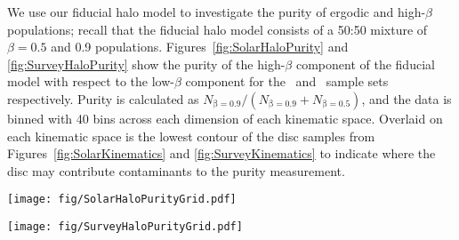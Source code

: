 We use our fiducial halo model to investigate the purity of ergodic and high-$\beta$ populations; recall that the fiducial halo model consists of a 50:50 mixture of $\beta=0.5$ and 0.9 populations. Figures~\ref{fig:SolarHaloPurity} and \ref{fig:SurveyHaloPurity} show the purity of the high-$\beta$ component of the fiducial model with respect to the low-$\beta$ component for the \solar\ and \survey\ sample sets respectively. Purity is calculated as $N_\mathrm{\beta=0.9}/(N_\mathrm{\beta=0.9}+N_\mathrm{\beta=0.5})$, and the data is binned with 40 bins across each dimension of each kinematic space. Overlaid on each kinematic space is the lowest contour of the disc samples from Figures~\ref{fig:SolarKinematics} and \ref{fig:SurveyKinematics} to indicate where the disc may contribute contaminants to the purity measurement.

\begin{figure*}
	\centering
	\texttt{[image: fig/SolarHaloPurityGrid.pdf]}
	\caption{Purity of high-$\beta$ halo samples with respect to low-$\beta$ samples for the \solar\ sample set. The kinematic spaces and units are as described in Figure~\ref{fig:SolarKinematics}. The grey bins are those with fewer than 5 samples in them. In each of the panels the dashed black ellipse(s) show the selection ellipses for the high-$\beta$ sample. The solid black contour is the lowest contour of disc stars from Figure~\ref{fig:SolarKinematics}.}
	\label{fig:SolarHaloPurity}
\end{figure*}

\begin{figure*}
	\centering
	\texttt{[image: fig/SurveyHaloPurityGrid.pdf]}
	\caption{Same as Figure~\ref{fig:SolarHaloPurity} but for the augmented \survey\ sample set. Here, the solid black contour shows ten samples per bin calculated in the same manner as Figure~\ref{fig:SurveyKinematics}.}
	\label{fig:SurveyHaloPurity}
\end{figure*}

